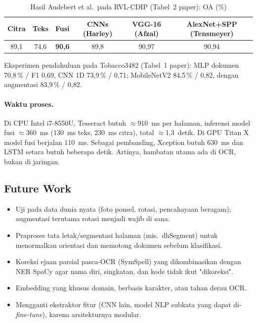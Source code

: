 \begin{table}[H]
  \centering
  \caption{Hasil Audebert et al.\ pada RVL-CDIP (Tabel~2 paper): OA (\%)}
  \label{tab:aud-rvl}
  \fontsize{10}{12}\selectfont
  \begin{tabular}{|c|c|c|c|c|c|}
    \hline
    \textbf{Citra} & \textbf{Teks} & \textbf{Fusi} & CNNs (Harley) & VGG-16 (Afzal) & AlexNet+SPP (Tensmeyer) \\ \hline
    89,1 & 74,6 & \textbf{90,6} & 89,8 & 90,97 & 90,94 \\ \hline
  \end{tabular}
\end{table}

Eksperimen pendahuluan pada Tobacco3482 (Tabel~1 paper): MLP dokumen 70,8\,\% / F1 0,69,
CNN 1D 73,9\,\% / 0,71; MobileNetV2 84,5\,\% / 0,82, dengan augmentasi 83,9\,\% / 0,82.

\paragraph{Waktu proses.} Di CPU Intel i7-8550U, Tesseract butuh $\approx$910~ms per
halaman, inferensi model fusi $\approx$360~ms (130~ms teks, 230~ms citra), total
$\approx$1,3~detik. Di GPU Titan X model fusi berjalan 110~ms. Sebagai pembanding,
Xception butuh 630~ms dan LSTM setara butuh beberapa detik. Artinya, hambatan utama ada
di OCR, bukan di jaringan.

\subsection{Future Work}
\begin{itemize}
  \item Uji pada data dunia nyata (foto ponsel, rotasi, pencahayaan beragam); augmentasi
        terutama rotasi menjadi wajib di sana.
  \item Praproses tata letak/segmentasi halaman (mis.\ dhSegment) untuk menormalkan
        orientasi dan memotong dokumen sebelum klasifikasi.
  \item Koreksi ejaan parsial pasca-OCR (SymSpell) yang dikombinasikan dengan NER SpaCy agar
        nama diri, singkatan, dan kode tidak ikut "dikoreksi".
  \item Embedding yang khusus domain, berbasis karakter, atau tahan derau OCR.
  \item Mengganti ekstraktor fitur (CNN lain, model NLP subkata yang dapat di-\emph{fine-tune}),
        karena arsitekturnya modular.
\end{itemize}

